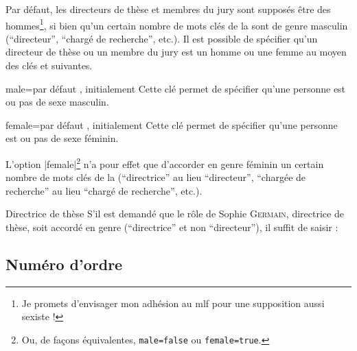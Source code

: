 %
%
Par défaut, les directeurs de thèse et membres du jury sont supposés être des
hommes\footnote{Je promets d'envisager mon adhésion au \acrshort{mlf} pour une
  supposition aussi sexiste !}, si bien qu'un certain nombre de mots clés de la
\yatCl{} sont de genre masculin (\enquote{directeur}, \enquote{chargé de
  recherche}, etc.). Il est possible de spécifier qu'un directeur de thèse ou
un membre du jury est un homme ou une femme au moyen des clés  et
 suivantes.

\begin{docKey}{male}{=\textbar{}}{par défaut
    , initialement }
  Cette clé permet de spécifier qu'une personne est ou pas de sexe masculin.
\end{docKey}

\begin{docKey}{female}{=\textbar{}}{par défaut
    , initialement }
  Cette clé permet de spécifier qu'une personne est ou pas de sexe féminin.
\end{docKey}

L'option |female|\footnote{Ou, de façons équivalentes,
  \protect\lstinline+male=false+ ou \protect\lstinline+female=true+.} n'a pour
effet que d'accorder en genre féminin un certain nombre de mots clés de la
\yatCl{} (\enquote{directrice} au lieu \enquote{directeur}, \enquote{chargée de
  recherche} au lieu \enquote{chargé de recherche}, etc.).

\begin{dbexample}{Directrice de thèse}{}
  S'il est demandé que le rôle de Sophie \textsc{Germain}, directrice de thèse,
  soit accordé en genre (\enquote{directrice} et non \enquote{directeur}), il
  suffit de saisir :
\begin{preamblecode}[listing options={deletekeywords={[5]supervisor}}]
\end{preamblecode}
\end{dbexample}

\subsection{Numéro d'ordre}
\label{sec-numero-dordre}


